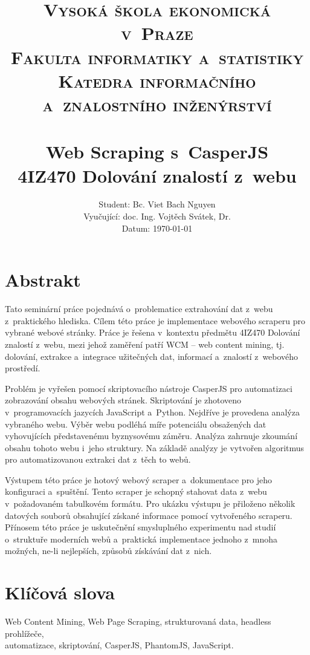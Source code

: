 \documentclass[11pt,a4paper]{article}
\title{   \normalsize\textsc {
          \large{Vysoká škola ekonomická v~Praze}\\[0.3cm]    
          \large{Fakulta informatiky a~statistiky}\\[0.3cm]
          \large{Katedra informačního a~znalostního inženýrství}\\
        }
\textsc{}                                               %
            \\[7.0cm]                                   %
            \huge \textbf{Web Scraping s~CasperJS}      %
            \HRule{2pt} \\ [0.4cm]                      %
            \normalsize \textbf{4IZ470 Dolování znalostí z~webu}
        }
\author{\raggedright
        \normalsize
        Student: Bc. Viet Bach Nguyen \\
        \normalsize
        Vyučující: doc. Ing. Vojtěch Svátek, Dr. \\
        \normalsize 
        Datum: \today
}
\makeatletter
\def\printtitle{                       
    {\centering \@title\par}}
\def\printauthor{                   
    {\centering \large \@author}}
\makeatother
\begin{document}
\thispagestyle{empty}           %

\printtitle                     %
      \vfill
\printauthor                    %
\newpage


\setcounter{page}{1}

\section*{Abstrakt}
Tato seminární práce pojednává o~problematice extrahování dat z~webu z~praktického hlediska. Cílem této práce je implementace webového scraperu pro vybrané webové stránky. Práce je řešena v~kontextu předmětu 4IZ470 Dolování znalostí z~webu, mezi jehož zaměření patří WCM -- web content mining, tj. dolování, extrakce a~integrace užitečných dat, informací a~znalostí z~webového prostředí. 

Problém je vyřešen pomocí skriptovacího nástroje CasperJS pro automatizaci zobrazování obsahu webových stránek. Skriptování je zhotoveno v~programovacích jazycích JavaScript a~Python. Nejdříve je provedena analýza vybraného webu. Výběr webu podléhá míře potenciálu obsažených dat vyhovujících představenému byznysovému záměru. Analýza zahrnuje zkoumání obsahu tohoto webu i~jeho struktury. Na základě analýzy je vytvořen algoritmus pro automatizovanou extrakci dat z~těch to webů. 

Výstupem této práce je hotový webový scraper a~dokumentace pro jeho konfiguraci a~spuštění. Tento scraper je schopný stahovat data z~webu v~požadovaném tabulkovém formátu. Pro ukázku výstupu je přiloženo několik datových souborů obsahující získané informace pomocí vytvořeného scraperu. Přínosem této práce je uskutečnění smysluplného experimentu nad studií o~struktuře moderních webů a~praktická implementace jednoho z~mnoha možných, ne-li nejlepších, způsobů získávání dat z~nich.

\section*{Klíčová slova}
Web Content Mining, Web Page Scraping, strukturovaná data, headless prohlížeče,\\ automatizace, skriptování, CasperJS, PhantomJS, JavaScript.

\newpage

 
\tableofcontents

\newpage
\end{document}
